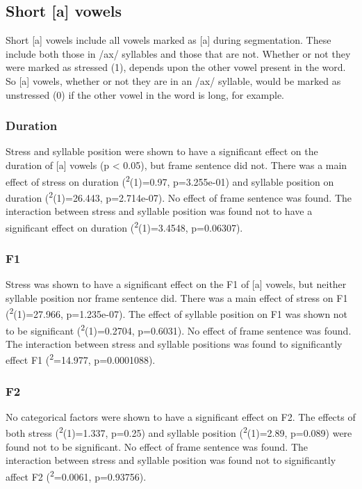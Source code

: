 \documentclass[floatsintext,man]{apa6}
\theoremstyle{definition}
\theoremstyle{definition}
\theoremstyle{definition}
\theoremstyle{remark}
\begin{document}
\subsection{Short {[}a{]} vowels}\label{short-a-vowels}

Short {[}a{]} vowels include all vowels marked as {[}a{]} during
segmentation. These include both those in /ax/ syllables and those that
are not. Whether or not they were marked as stressed (1), depends upon
the other vowel present in the word. So {[}a{]} vowels, whether or not
they are in an /ax/ syllable, would be marked as unstressed (0) if the
other vowel in the word is long, for example.

\subsubsection{Duration}\label{duration}

Stress and syllable position were shown to have a significant effect on
the duration of {[}a{]} vowels (p \textless{} 0.05), but frame sentence
did not. There was a main effect of stress on duration
(\textsuperscript{2}(1)=0.97, p=3.255e-01) and syllable
position on duration (\textsuperscript{2}(1)=26.443,
p=2.714e-07). No effect of frame sentence was found. The interaction
between stress and syllable position was found not to have a significant
effect on duration (\textsuperscript{2}(1)=3.4548,
p=0.06307).

\subsubsection{F1}\label{f1}

Stress was shown to have a significant effect on the F1 of {[}a{]}
vowels, but neither syllable position nor frame sentence did. There was
a main effect of stress on F1 (\textsuperscript{2}(1)=27.966,
p=1.235e-07). The effect of syllable position on F1 was shown not to be
significant (\textsuperscript{2}(1)=0.2704, p=0.6031). No
effect of frame sentence was found. The interaction between stress and
syllable positions was found to significantly effect F1
(\textsuperscript{2}=14.977, p=0.0001088).

\subsubsection{F2}\label{f2}

No categorical factors were shown to have a significant effect on F2.
The effects of both stress (\textsuperscript{2}(1)=1.337,
p=0.25) and syllable position (\textsuperscript{2}(1)=2.89,
p=0.089) were found not to be significant. No effect of frame sentence
was found. The interaction between stress and syllable position was
found not to significantly affect F2
(\textsuperscript{2}=0.0061, p=0.93756).
\end{document}
